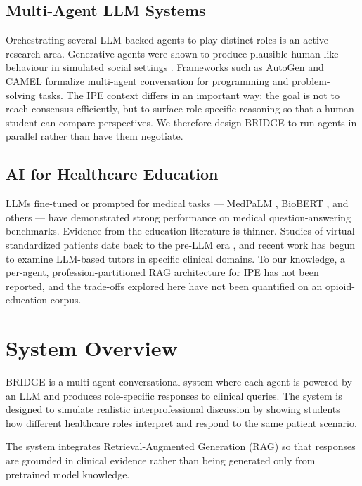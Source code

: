 \documentclass[12pt]{article}
\begin{document}
\subsection{Multi-Agent LLM Systems}

Orchestrating several LLM-backed agents to play distinct roles is an active research area. Generative agents were shown to produce plausible human-like behaviour in simulated social settings \cite{park2023generative}. Frameworks such as AutoGen \cite{wu2023autogen} and CAMEL \cite{li2023camel} formalize multi-agent conversation for programming and problem-solving tasks. The IPE context differs in an important way: the goal is not to reach consensus efficiently, but to surface role-specific reasoning so that a human student can compare perspectives. We therefore design BRIDGE to run agents in parallel rather than have them negotiate.

\subsection{AI for Healthcare Education}

LLMs fine-tuned or prompted for medical tasks --- MedPaLM \cite{singhal2023medpalm}, BioBERT \cite{lee2020biobert}, and others --- have demonstrated strong performance on medical question-answering benchmarks. Evidence from the education literature is thinner. Studies of virtual standardized patients date back to the pre-LLM era \cite{stevens2006virtual}, and recent work has begun to examine LLM-based tutors in specific clinical domains. To our knowledge, a per-agent, profession-partitioned RAG architecture for IPE has not been reported, and the trade-offs explored here have not been quantified on an opioid-education corpus.



\section{System Overview}

BRIDGE is a multi-agent conversational system where each agent is powered by an LLM and produces role-specific responses to clinical queries. The system is designed to simulate realistic interprofessional discussion by showing students how different healthcare roles interpret and respond to the same patient scenario.

The system integrates Retrieval-Augmented Generation (RAG) so that responses are grounded in clinical evidence rather than being generated only from pretrained model knowledge.
\end{document}
